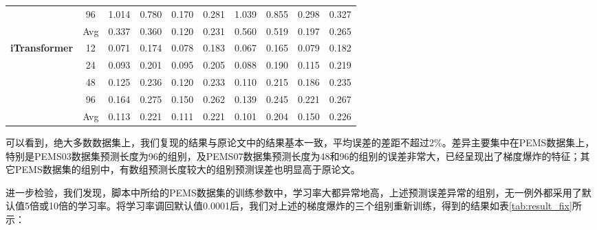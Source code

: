 \documentclass[twoside,12pt]{article}
\begin{document}
\begin{table}[htbp]
{\begin{small}
\begin{tabular}{c|c|cc|cc|cc|cc}
                                                                 & 96         & 1.014                       & 0.780                       & 0.170                       & 0.281                       & 1.039 & 0.855 & 0.298 & 0.327 \\
        \cmidrule(lr){2-10}
                                                                 & Avg        & 0.337                       & 0.360                       & 0.120                       & 0.231                       & 0.560 & 0.519 & 0.197 & 0.265 \\
        \midrule
        \multirow{5}{*}{\textbf{iTransformer}}                   & 12         & 0.071                       & 0.174                       & 0.078                       & 0.183                       & 0.067 & 0.165 & 0.079 & 0.182 \\
                                                                 & 24         & 0.093                       & 0.201                       & 0.095                       & 0.205                       & 0.088 & 0.190 & 0.115 & 0.219 \\
                                                                 & 48         & 0.125                       & 0.236                       & 0.120                       & 0.233                       & 0.110 & 0.215 & 0.186 & 0.235 \\
                                                                 & 96         & 0.164                       & 0.275                       & 0.150                       & 0.262                       & 0.139 & 0.245 & 0.221 & 0.267 \\
        \cmidrule(lr){2-10}
                                                                 & Avg        & 0.113                       & 0.221                       & 0.111                       & 0.221                       & 0.101 & 0.204 & 0.150 & 0.226 \\
        \bottomrule
      \end{tabular}
    \end{small}
  }
\end{table}

可以看到，绝大多数数据集上，我们复现的结果与原论文中的结果基本一致，平均误差的差距不超过2\%。差异主要集中在PEMS数据集上，特别是PEMS03数据集预测长度为96的组别，及PEMS07数据集预测长度为48和96的组别的误差非常大，已经呈现出了梯度爆炸的特征；其它PEMS数据集的组别中，有数组预测长度较大的组别预测误差也明显高于原论文。

进一步检验，我们发现，脚本中所给的PEMS数据集的训练参数中，学习率大都异常地高，上述预测误差异常的组别，无一例外都采用了默认值5倍或10倍的学习率。将学习率调回默认值0.0001后，我们对上述的梯度爆炸的三个组别重新训练，得到的结果如表\ref{tab:result_fix}所示：
\end{document}
